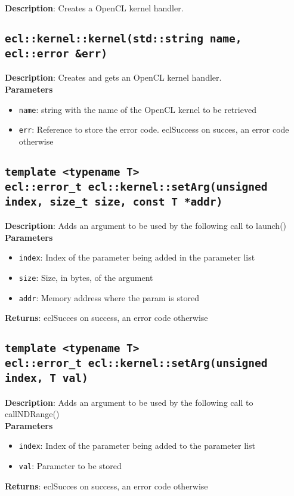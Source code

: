 \textbf{Description}: Creates a OpenCL kernel handler.

\subsection{\texttt{ecl::kernel::kernel(std::string name, ecl::error \&err)}}

\textbf{Description}: Creates and gets an OpenCL kernel handler. \\
\textbf{Parameters}
\begin{itemize}
  \item \texttt{name}: string with the name of the OpenCL kernel to be retrieved
  \item \texttt{err}: Reference to store the error code. eclSuccess on succes, an error code 
  otherwise
\end{itemize}

\subsection{\texttt{template <typename T>\\ecl::error\_t ecl::kernel::setArg(unsigned index, size\_t 
size, const T *addr)}}

\textbf{Description}: Adds an argument to be used by the following call to launch()\\
\textbf{Parameters}
\begin{itemize}
  \item \texttt{index}: Index of the parameter being added in the parameter list
  \item \texttt{size}: Size, in bytes, of the argument
  \item \texttt{addr}: Memory address where the param is stored
\end{itemize}
\textbf{Returns}: eclSucces on success, an error code otherwise

\subsection{\texttt{template <typename T>\\ecl::error\_t ecl::kernel::setArg(unsigned index, T 
val)}}

\textbf{Description}: Adds an argument to be used by the following call to callNDRange()\\
\textbf{Parameters}
\begin{itemize}
  \item \texttt{index}: Index of the parameter being added to the parameter list
  \item \texttt{val}: Parameter to be stored
\end{itemize}
\textbf{Returns}: eclSucces on success, an error code otherwise

